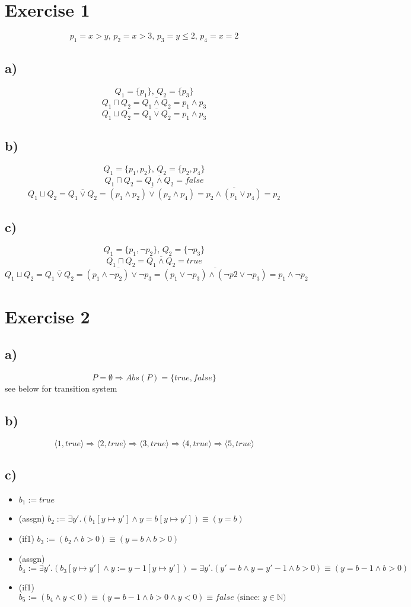 \documentclass[fleqn,12pt]{article}
\begin{document}
\section*{Exercise 1}
$$p_1 = x>y \text{, }p_2 = x>3 \text{, }p_3 = y \leq 2 \text{, } p_4 = x = 2$$
\subsection*{a)}
$$Q_1 = \{p_1\}\text{, } Q_2 =  \{p_3\}$$
$$Q_1 \sqcap Q_2 = \overline{Q_1 \wedge Q_2} = p_1\wedge p_3$$
$$Q_1 \sqcup Q_2 = \overline{Q_1 \vee Q_2} = p_1 \wedge p_3$$
\subsection*{b)}
$$Q_1 = \{p_1,p_2\}\text{, } Q_2 =  \{p_2,p_4\}$$
$$Q_1 \sqcap Q_2 = \overline{Q_1 \wedge Q_2} = false$$
$$Q_1 \sqcup Q_2 = \overline{Q_1 \vee Q_2} = \overline{(p_1 \wedge p_2) \vee (p_2 \wedge p_4)} = \overline{p_2 \wedge (p_1 \vee p_4)} = p_2$$
\subsection*{c)}
$$Q_1 = \{p_1,\lnot p_2\}\text{, } Q_2 =  \{\lnot p_3\}$$
$$Q_1 \sqcap Q_2 = \overline{Q_1 \wedge Q_2} = true$$
$$Q_1 \sqcup Q_2 = \overline{Q_1 \vee Q_2} = \overline{(p_1 \wedge \lnot p_2) \vee \lnot p_3} = \overline{(p_1 \vee \lnot p_3) \wedge (\lnot p2 \vee \lnot p_3)} = p_1 \wedge \lnot p_2$$
\section*{Exercise 2}

\subsection*{a)}
$$P=\emptyset \Rightarrow Abs(P) = \{true,false\}$$
see below for transition system
\subsection*{b)}
$$\langle 1, true \rangle \Rightarrow \langle 2, true \rangle \Rightarrow \langle 3, true \rangle \Rightarrow \langle 4, true \rangle \Rightarrow \langle 5, true \rangle$$
\subsection*{c)}
\begin{itemize}
\item $b_1 := true$
\item (assgn) $b_2 := \exists y'.(b_1[y\mapsto y'] \wedge y=b[y \mapsto y']) \equiv (y=b) $
\item (if1) $b_3 := (b_2 \wedge b > 0) \equiv (y=b \wedge b>0)$
\item (assgn) $b_4 := \exists y'. (b_3[y \mapsto y'] \wedge y := y -1 [y \mapsto y']) =  \exists y'. (y'=b \wedge y = y' - 1 \wedge b>0) \equiv (y=b - 1 \wedge b>0)$
\item (if1) $b_5 := (b_4 \wedge y < 0) \equiv (y=b-1 \wedge b>0 \wedge y<0) \equiv false \text{ (since: }y \in \mathbb{N})$
\end{itemize}
\end{document}
